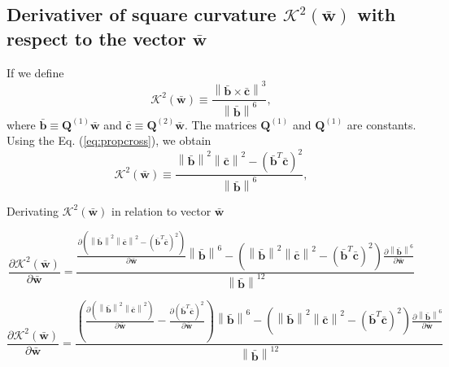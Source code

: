 \subsection{Derivativer of square curvature $\mathcal{K}^{2}(\mathbf{\bar{w}})$ with respect to the vector $\mathbf{\bar{w}}$}
If we define
\begin{equation}
\mathcal{K}^{2}(\mathbf{\bar{w}})
\equiv
\frac{\left\| \mathbf{\bar{b}} \times \mathbf{\bar{c}} \right\|^{3}}{\left\| \mathbf{\bar{b}} \right\|^{6}},
\end{equation}
where $\mathbf{\bar{b}} \equiv \mathbf{Q}^{(1)} \mathbf{\bar{w}}$ and $\mathbf{\bar{c}} \equiv \mathbf{Q}^{(2)} \mathbf{\bar{w}}$. The matrices $\mathbf{Q}^{(1)}$ and $\mathbf{Q}^{(1)}$ are constants. 
Using the Eq. (\ref{eq:propcross}), we obtain
\begin{equation}
\mathcal{K}^{2}(\mathbf{\bar{w}})
\equiv
\frac{
\left\|
\mathbf{\bar{b}} 
\right\|^{2}
\left\|
\mathbf{\bar{c}}
\right\|^{2}
-
\left(
\mathbf{\bar{b}}^{T}
\mathbf{\bar{c}}
\right)^{2}
}
{\left\| \mathbf{\bar{b}} \right\|^{6}},
\end{equation}

Derivating $\mathcal{K}^{2}(\mathbf{\bar{w}})$ in relation to vector $\mathbf{\bar{w}}$

\begin{equation}
\frac{
\partial 
\mathcal{K}^{2}(\mathbf{\bar{w}})
}
{
\partial \mathbf{\bar{w}}
}
=
\frac{
\frac{
\partial 
\left(
\left\|
\mathbf{\bar{b}} 
\right\|^{2}
\left\|
\mathbf{\bar{c}}
\right\|^{2}
-
\left(
\mathbf{\bar{b}}^{T}
\mathbf{\bar{c}}
\right)^{2}
\right)
}
{\partial \mathbf{\bar{w}}}
\left\| \mathbf{\bar{b}} \right\|^{6}
-
\left(
\left\|
\mathbf{\bar{b}} 
\right\|^{2}
\left\|
\mathbf{\bar{c}}
\right\|^{2}
-
\left(
\mathbf{\bar{b}}^{T}
\mathbf{\bar{c}}
\right)^{2}
\right)
\frac{
\partial
\left\| \mathbf{\bar{b}} \right\|^{6}
}
{
\partial \mathbf{\bar{w}}
}
}
{\left\| \mathbf{\bar{b}} \right\|^{12}}
\end{equation}



\begin{equation}\label{eq:curve2}
\frac{
\partial 
\mathcal{K}^{2}(\mathbf{\bar{w}})
}
{
\partial \mathbf{\bar{w}}
}
=
\frac{
\left(
\frac{
\partial 
\left(
\left\|\mathbf{\bar{b}}\right\|^2
\left\|\mathbf{\bar{c}}\right\|^2
\right)
}
{\partial \mathbf{\bar{w}}}
-
\frac{
\partial
\left(
\mathbf{\bar{b}}^{T}
\mathbf{\bar{c}}
\right)^{2}
}
{\partial \mathbf{\bar{w}}}
\right)
\left\| \mathbf{\bar{b}} \right\|^{6}
-
\left(
\left\|
\mathbf{\bar{b}} 
\right\|^{2}
\left\|
\mathbf{\bar{c}}
\right\|^{2}
-
\left(
\mathbf{\bar{b}}^{T}
\mathbf{\bar{c}}
\right)^{2}
\right)
\frac{
\partial
\left\| \mathbf{\bar{b}} \right\|^{6}
}
{
\partial \mathbf{\bar{w}}
}
}
{\left\| \mathbf{\bar{b}} \right\|^{12}}
\end{equation}

